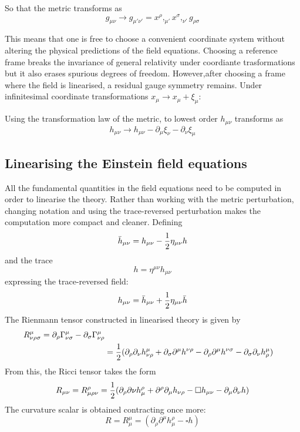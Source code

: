 \documentclass[binding=0.6cm, LaM]{sapthesis}
\begin{document}
So that the metric transforms as 
\begin{equation}
g_{\mu\nu} \rightarrow g_{\mu' \nu'} = x^{\rho},_{\mu'}x^{\sigma},_{\nu'}g_{\rho \sigma}
\end{equation}


This means that one is free to choose a convenient coordinate system without altering the physical predictions of the field equations. Choosing a reference frame breaks the invariance of general relativity under coordiante trasformations but it also erases spurious degrees of freedom.
However,after choosing a frame where the field is linearised, a residual gauge symmetry remains. Under infinitesimal coordinate transformations
 $x_{\mu} \rightarrow x_{\mu} + \xi_{\mu}$:

Using the transformation law of the metric, to lowest order $h_{\mu\nu}$ transforms as
\[
h_{\mu\nu} \rightarrow h_{\mu\nu} - \partial_{\mu}\xi_{\nu} - \partial_{\nu}\xi_{\mu}
\]
\subsection{Linearising the Einstein field equations}
All the fundamental quantities in the field equations need to be computed in order to linearise the theory. Rather than working with the metric perturbation, changing notation and using the trace-reversed perturbation makes the computation more compact and cleaner. Defining 
\begin{equation}
{\bar h}_{\mu\nu} = h_{\mu\nu} - {1 \over {2}}\eta_{\mu\nu}h  
\end{equation}
and the trace 
\begin{equation}
h = \eta^{\mu\nu}h_{\mu\nu}
\end{equation}
expressing the trace-reversed field:
\begin{equation}
h_{\mu\nu} = {\bar h}_{\mu\nu} + {1 \over {2}}\eta_{\mu\nu}{\bar h}
\end{equation} 
The Rienmann tensor constructed in linearised theory is given by
\begin{align}

R^{\mu}_{\nu\rho\sigma} = \partial_{\rho} \Gamma^{\mu}_{\nu\sigma} - \partial_{\sigma}\Gamma^{\mu}_{\nu\rho}  \\
&={ 1 \over 2} (\partial_{\rho}\partial_{\nu}h^{\mu}_{\nu\rho} + \partial_{\sigma}\partial^{\mu}h^{\nu\rho} - \partial_{\rho}\partial^{\mu}h^{\nu\sigma} - \partial_{\sigma}\partial_{\nu}h^{\mu}_{\rho})

\end{align}
From this, the Ricci tensor takes the form
\begin{equation}
R_{\mu\nu} = R^{\rho}_{\mu\rho\nu} = {1 \over 2}(\partial_{\rho}\partial{\nu}h^{\rho}_{\mu} + \partial^{\rho}\partial_{\mu}h_{\nu\rho} - \square h_{\mu\nu} - \partial_{\mu}\partial_{\nu}h)
\end{equation}
The curvature scalar is obtained contracting once more:
\begin{equation}
R = R^{\mu}_{\mu} = (\partial_{\rho}\partial^{\mu}h^{\rho}_{\mu} - \square h)
\end{equation}
\end{document}
